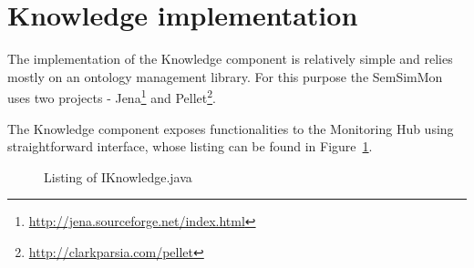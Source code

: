 \section{Knowledge implementation}

The implementation of the Knowledge component is relatively simple and relies mostly on an ontology management library. For this purpose the SemSimMon uses two projects - Jena\footnote{\url{http://jena.sourceforge.net/index.html}} and Pellet\footnote{\url{http://clarkparsia.com/pellet}}. 

The Knowledge component exposes functionalities to the Monitoring Hub using straightforward interface, whose listing can be found in Figure~\ref{fig:iknowledge_java}.

\begin{figure}[ht]
  \centering
  
  \caption{Listing of IKnowledge.java}
  \label{fig:iknowledge_java}
\end{figure} 
